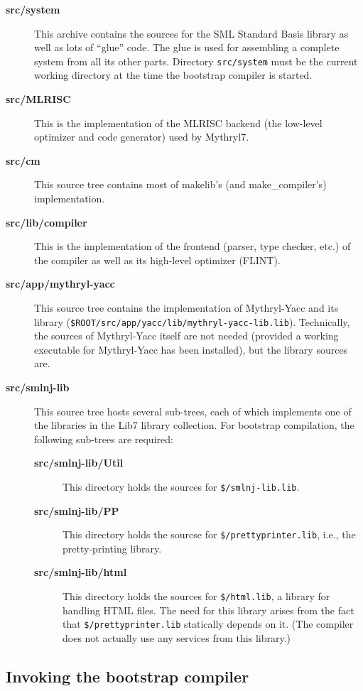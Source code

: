 \begin{description}
\item[{\bf src/system}] This archive contains the sources for the SML
Standard Basis library as well as lots of ``glue'' code.  The glue is
used for assembling a complete system from all its other parts.
Directory {\tt src/system} must be the current working directory at
the time the bootstrap compiler is started.
\item[{\bf src/MLRISC}] This is the implementation of the MLRISC
backend (the low-level optimizer and code generator) used by Mythryl7.
\item[{\bf src/cm}] This source tree contains most of makelib's (and make_compiler's)
implementation.
\item[{\bf src/lib/compiler}] This is the implementation of the frontend
(parser, type checker, etc.) of the compiler as well as its high-level
optimizer (FLINT).
\item[{\bf src/app/mythryl-yacc}] This source tree contains the implementation
of Mythryl-Yacc and its library ({\tt \$ROOT/src/app/yacc/lib/mythryl-yacc-lib.lib}).
Technically, the sources of Mythryl-Yacc itself are not needed (provided a
working executable for Mythryl-Yacc has been installed), but the library
sources are.
\item[{\bf src/smlnj-lib}] This source tree hosts several sub-trees,
each of which implements one of the libraries in the Lib7 library
collection.  For bootstrap compilation, the following sub-trees are
required:
\begin{description}
\item[{\bf src/smlnj-lib/Util}] This directory holds the sources for
{\tt \$/smlnj-lib.lib}.
\item[{\bf src/smlnj-lib/PP}] This directory holds the sourcse for
{\tt \$/prettyprinter.lib}, i.e., the pretty-printing library.
\item[{\bf src/smlnj-lib/html}] This directory holds the sources for
{\tt \$/html.lib}, a library for handling HTML files.  The need for
this library arises from the fact that {\tt \$/prettyprinter.lib} statically
depends on it.  (The compiler does not actually use any services from
this library.)
\end{description}
\end{description}

\subsection{Invoking the bootstrap compiler}

